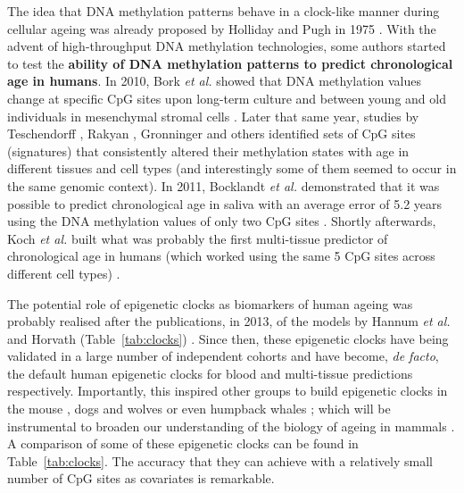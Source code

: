 \bigskip

The idea that DNA methylation patterns behave in a clock-like manner during cellular ageing was already proposed by Holliday and Pugh in 1975 \cite{Holliday1975}. With the advent of high-throughput DNA methylation technologies, some authors started to test the \textbf{ability of DNA methylation patterns to predict chronological age in humans}. In 2010, Bork \textit{et al.} showed that DNA methylation values change at specific CpG sites upon long-term culture and between young and old individuals in mesenchymal stromal cells \cite{Bork2010}. Later that same year, studies by Teschendorff \cite{Teschendorff2010}, Rakyan \cite{Rakyan2010}, Gronninger \cite{Gronniger2010} and others identified sets of CpG sites (signatures) that consistently altered their methylation states with age in different tissues and cell types (and interestingly some of them seemed to occur in the same genomic context). In 2011, Bocklandt \textit{et al.} demonstrated that it was possible to predict chronological age in saliva with an average error of 5.2 years using the DNA methylation values of only two CpG sites \cite{Bocklandt2011}. Shortly afterwards, Koch \textit{et al.} built what was probably the first multi-tissue predictor of chronological age in humans (which worked using the same 5 CpG sites across different cell types) \cite{Koch2011}. 

\bigskip

The potential role of epigenetic clocks as biomarkers of human ageing was probably realised after the publications, in 2013, of the models by Hannum \textit{et al.} \cite{Hannum2013} and Horvath (Table~\ref{tab:clocks}) \cite{Horvath2013}. Since then, these epigenetic clocks have being validated in a large number of independent cohorts and have become, \textit{de facto}, the default human epigenetic clocks for blood and multi-tissue predictions respectively. Importantly, this inspired other groups to build epigenetic clocks in the mouse \cite{Wang2017,Stubbs2017,Petkovich2017,Thompson2018,Meer2018}, dogs and wolves \cite{Thompson2017} or even humpback whales \cite{Polanowski2014}; which will be instrumental to broaden our understanding of the biology of ageing in mammals \cite{Stubbs2017}. A comparison of some of these epigenetic clocks can be found in Table~\ref{tab:clocks}. The accuracy that they can achieve with a relatively small number of CpG sites as covariates is remarkable.

\bigskip

